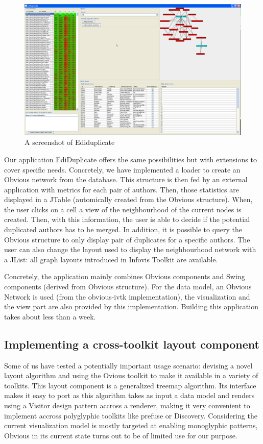 \begin{figure}[!h]
\includegraphics[width=\columnwidth]{figures/ediduplicate}
\caption{A screenshot of Ediduplicate}
\label{fig:ediduplicate}
\end{figure}

Our application EdiDuplicate offers the same possibilities but with extensions to cover specific needs. Concretely, we have implemented a loader to create an Obvious network from the  database. This structure is then fed by an external application with metrics for each pair of authors. Then, those statistics are displayed in a JTable (automically created from the Obvious structure). When, the user clicks on a cell a view of the neighbourhood of the current nodes is created. Then, with this information, the user is able to decide if the potential duplicated authors has to be merged. In addition, it is possible to query the Obvious structure to only display pair of duplicates for a specific authors. The user can also change the layout used to display the neighbourhood network with a JList: all graph layouts introduced in Infovis Toolkit are available. 

Concretely, the application mainly combines Obvious components and Swing components (derived from Obvious structure). For the data model, an Obvious Network is used (from the obvious-ivtk implementation), the visualization and the view part are also provided by this implementation. Building this application takes about less than a week.

\subsection{Implementing a cross-toolkit layout component}

Some of us have tested a potentially important usage scenario: devising a novel layout algorithm and using the Ovious toolkit to make it available in a variety of toolkits. This layout component is a generalized treemap algorithm.
Its interface makes it easy to port as this algorithm takes as input a data model and renders using a Visitor design pattern accross a renderer, making it very convenient to implement accross polyglyphic toolkits like prefuse or Discovery. Considering the current visualization model is mostly targeted at enabling monoglyphic patterns, Obvious in its current state turns out to be of limited use for our purpose.

